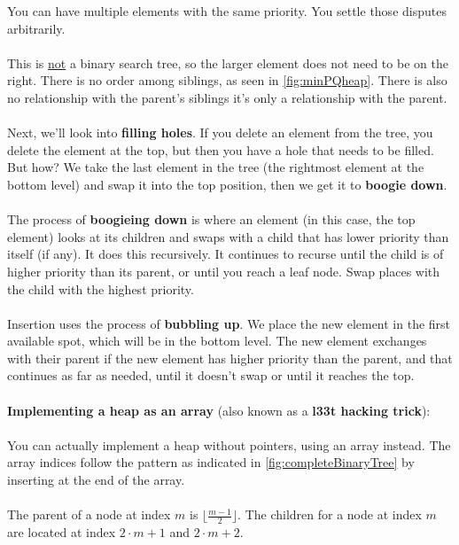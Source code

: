 \documentclass[]{article}
\theoremstyle{definition}
\begin{document}
\begin{enumerate}
						You can have multiple elements with the same priority. You settle those disputes arbitrarily.
						\\ \\
						This is \underline{not} a binary search tree, so the larger element does not need to be on the right. There is no order among siblings, as seen in \ref{fig:minPQheap}. There is also no relationship with the parent's siblings \textendash{} it's only a relationship with the parent.
						\\ \\
						Next, we'll look into \textbf{filling holes}. If you delete an element from the tree, you delete the element at the top, but then you have a hole that needs to be filled. But how? We take the last element in the tree (the rightmost element at the bottom level) and swap it into the top position, then we get it to \textbf{boogie down}.
						\\ \\
						The process of \textbf{boogieing down} is where an element (in this case, the top element) looks at its children and swaps with a child that has lower priority than itself (if any). It does this recursively. It continues to recurse until the child is of higher priority than its parent, or until you reach a leaf node. Swap places with the child with the highest priority.
						\\ \\
						Insertion uses the process of \textbf{bubbling up}. We place the new element in the first available spot, which will be in the bottom level. The new element exchanges with their parent if the new element has higher priority than the parent, and that continues as far as needed, until it doesn't swap or until it reaches the top.
						\\ \\
						\textbf{Implementing a heap as an array} (also known as a \textbf{l33t hacking trick}):
						\\ \\ 
						You can actually implement a heap without pointers, using an array instead. The array indices follow the pattern as indicated in \ref{fig:completeBinaryTree} by inserting at the end of the array.
						\\ \\
						The parent of a node at index $m$ is $\lfloor \frac{m - 1}{2} \rfloor$. The children for a node at index $m$ are located at index $2 \cdot m + 1$ and $2 \cdot m + 2$.
						\\ \\

\end{enumerate}
\end{document}
